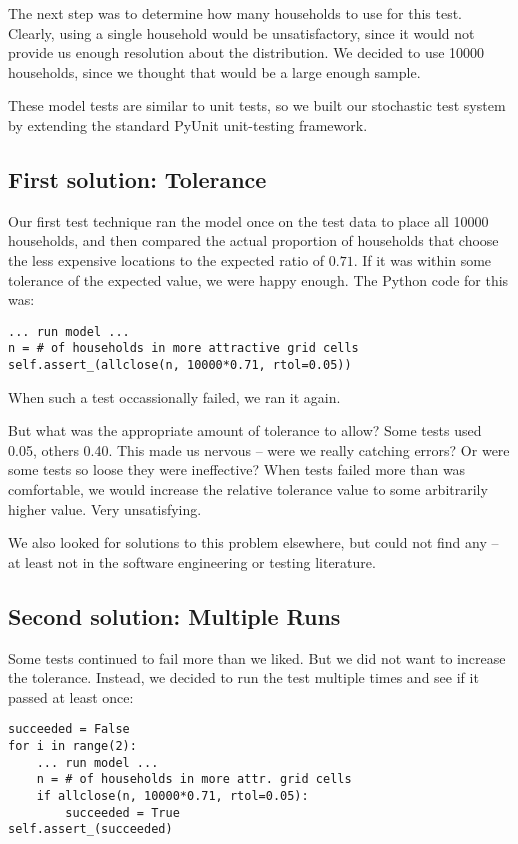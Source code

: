 The next step was to determine how many households to use for this test. 
Clearly, using a single household would be unsatisfactory, since it would not
provide us enough resolution about the distribution.  We decided to use 10000
households, since we thought that would be a large enough sample.

These model tests are similar to unit tests, so we built our stochastic test 
system by extending the standard PyUnit unit-testing framework.

\subsection{First solution: Tolerance}

Our first test technique ran the model once on the test data to place all 10000 
households, and then compared the actual proportion of households that choose
the less expensive locations to the expected ratio of $0.71$.  If it was within
some tolerance of the expected value, we were happy enough.  The Python code for
this was:

\begin{verbatim}
... run model ...
n = # of households in more attractive grid cells
self.assert_(allclose(n, 10000*0.71, rtol=0.05))
\end{verbatim}

When such a test occassionally failed, we ran it again.  

But what was the appropriate amount of tolerance to allow?  Some tests used 
0.05, others 0.40. This made us nervous -- were we really catching errors?  Or 
were some tests so loose they were ineffective?  When tests failed more than 
was comfortable, we would increase the relative tolerance value to some 
arbitrarily higher value.  Very unsatisfying.

We also looked for solutions to this problem elsewhere, but could not find any 
-- at least not in the software engineering or testing literature.

\subsection{Second solution: Multiple Runs}

Some tests continued to fail more than we liked.  But we did not want to 
increase the tolerance.  Instead, we decided to run the test multiple times and 
see if it passed at least once:

\begin{verbatim}
succeeded = False
for i in range(2):
    ... run model ...
    n = # of households in more attr. grid cells
    if allclose(n, 10000*0.71, rtol=0.05):
        succeeded = True
self.assert_(succeeded)
\end{verbatim}

